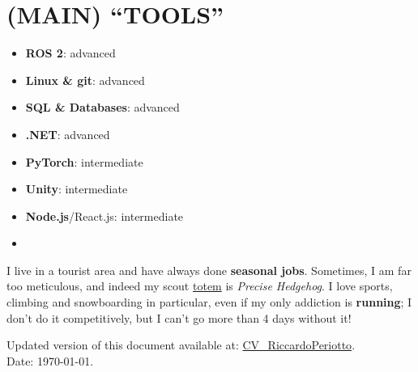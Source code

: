 \documentclass[11 pt,oneside,a4paper,titlepage]{article}
\begin{document}
{\begin{minipage}{11.3cm}
        \section*{{\faDesktop} (MAIN) “TOOLS” }
        \vspace*{-0.5cm}
        \begin{multicols}{2}    
        \begin{itemize}
        \footnotesize
            \item \textbf{ROS 2}: advanced
            \item \textbf{Linux \& git}: advanced
            \item \textbf{SQL \& Databases}: advanced
            \item \textbf{.NET}: advanced
            \item \textbf{PyTorch}: intermediate
            \item \textbf{Unity}: intermediate
            \item \textbf{Node.js}/React.js: intermediate    
            \item[\vspace{\fill}]
        \end{itemize}
        \end{multicols}
        

        I live in a tourist area and have always done \textbf{seasonal jobs}. Sometimes, I am far too meticulous, and indeed my scout \href{https://it.wikipedia.org/wiki/Totem_(nome_scout)}{totem} is \textit{Precise Hedgehog}. I love sports, climbing and snowboarding in particular, even if my only addiction is \textbf{running}; I don't do it competitively, but I can't go more than 4 days without it!
        
        \vspace*{0.18cm}
        Updated version of this document available at: \href{https://riccardoperiotto.github.io/CV_RiccardoPeriotto.pdf}{CV\_RiccardoPeriotto}. \\
        Date: \today.
    \end{minipage}} %
\end{document}
